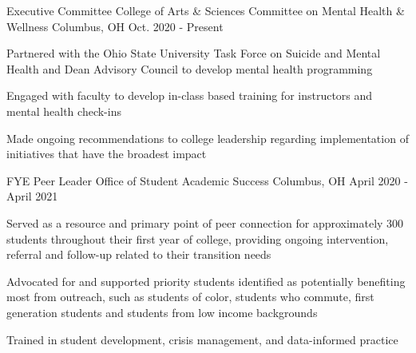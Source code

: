

\begin{cventries}

  \cventry
    {Executive Committee} %
    {College of Arts \& Sciences Committee on Mental Health \& Wellness} %
    {Columbus, OH} %
    {Oct. 2020 - Present} %
    {
      \begin{cvitems} %
        \item {Partnered with the Ohio State University Task Force on Suicide and Mental Health and Dean Advisory Council to develop mental health programming}
        \item {Engaged with faculty to develop in-class based training for instructors and mental health check-ins}
        \item {Made ongoing recommendations to college leadership regarding implementation of initiatives that have the broadest impact}
      \end{cvitems}
    }

  \cventry
    {FYE Peer Leader} %
    {Office of Student Academic Success} %
    {Columbus, OH} %
    {April 2020 - April 2021} %
    {
      \begin{cvitems} %
        \item {Served as a resource and primary point of peer connection for approximately 300 students throughout their first year of college, providing ongoing intervention, referral and follow-up related to their transition needs}
        \item {Advocated for and supported priority students identified as potentially benefiting most from outreach, such as students of color, students who commute, first generation students and students from low income backgrounds}
        \item{Trained in student development, crisis management, and data-informed practice}
      \end{cvitems}
    }


\end{cventries}
